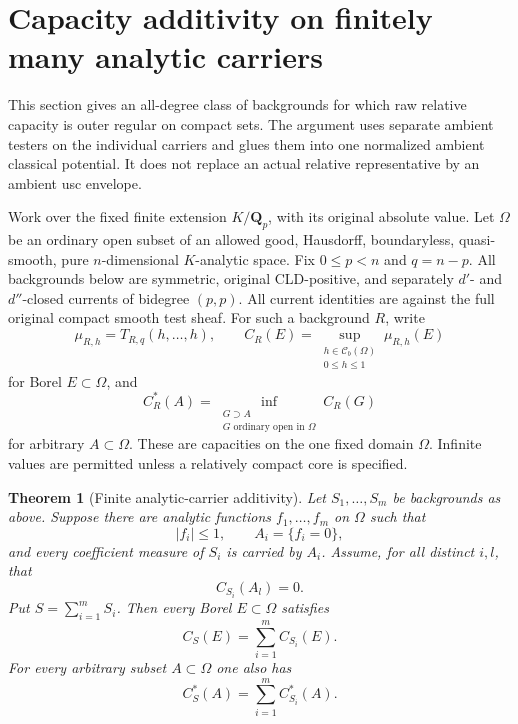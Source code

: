 \documentclass[11pt,a4paper]{article}
\numberwithin{equation}{section}
\newtheorem{theorem}{Theorem}[section]
\theoremstyle{definition}
\theoremstyle{remark}
\begin{document}


\section{Capacity additivity on finitely many analytic carriers}
\label{sec:r3-analytic-carrier-capacity}

This section gives an all-degree class of backgrounds for which raw
relative capacity is outer regular on compact sets.  The argument
uses separate ambient testers on the individual carriers and glues
them into one normalized ambient classical potential.  It does not
replace an actual relative representative by an ambient usc envelope.

Work over the fixed finite extension $K/\mathbf Q_p$, with its original
absolute value.  Let $\Omega$ be an ordinary open subset of an allowed
good, Hausdorff, boundaryless, quasi-smooth, pure $n$-dimensional
$K$-analytic space.  Fix $0\leq p<n$ and $q=n-p$.  All backgrounds
below are symmetric, original CLD-positive, and separately
$d'$- and $d''$-closed currents of bidegree $(p,p)$.  All current
identities are against the full original compact smooth test sheaf.
For such a background $R$, write
\[
 \mu_{R,h}=T_{R,q}(h,\ldots,h),\qquad
 C_R(E)=\sup_{\substack{h\in\mathcal C_b(\Omega)\\0\leq h\leq1}}
             \mu_{R,h}(E)
\]
for Borel $E\subset\Omega$, and
\[
 C_R^*(A)=\inf_{\substack{G\supset A\\G\text{ ordinary open in }\Omega}}
                  C_R(G)
\]
for arbitrary $A\subset\Omega$.  These are capacities on the one
fixed domain $\Omega$.  Infinite values are permitted unless a
relatively compact core is specified.

\begin{theorem}[Finite analytic-carrier additivity]
\label{thm:r3-analytic-carrier-additivity}
Let $S_1,\ldots,S_m$ be backgrounds as above.  Suppose there are
analytic functions $f_1,\ldots,f_m$ on $\Omega$ such that
\[
 |f_i|\leq1,\qquad A_i=\{f_i=0\},
\]
and every coefficient measure of $S_i$ is carried by $A_i$.
Assume, for all distinct $i,l$, that
\begin{equation}
 C_{S_i}(A_l)=0.
 \label{eq:r3-carrier-cross-null}
\end{equation}
Put $S=\sum_{i=1}^m S_i$.  Then every Borel $E\subset\Omega$
satisfies
\begin{equation}
 C_S(E)=\sum_{i=1}^m C_{S_i}(E).
 \label{eq:r3-carrier-raw-additivity}
\end{equation}
For every arbitrary subset $A\subset\Omega$ one also has
\begin{equation}
 C_S^*(A)=\sum_{i=1}^m C_{S_i}^*(A).
 \label{eq:r3-carrier-outer-additivity}
\end{equation}
\end{theorem}
\end{document}
